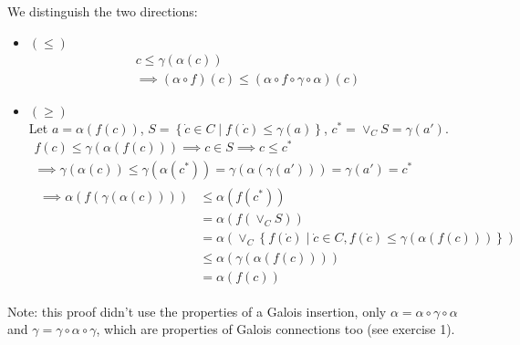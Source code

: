 \begin{exercise}
\begin{itemize}
        We distinguish the two directions:
        \begin{itemize}
            \item $(\leq)$
            \begin{gather*}
                c \leq \gamma(\alpha(c)) \\
                \implies (\alpha \circ f)(c) \leq (\alpha \circ f \circ \gamma \circ \alpha)(c)
            \end{gather*}
            \item $(\geq)$ \\
            Let $a = \alpha(f(c))$, $S = \left\{\dot{c} \in C \mid f(\dot{c}) \leq \gamma(a)\right\}$, $c^* = \vee_C S = \gamma(a')$.
            \begin{gather*}
                f(c) \leq \gamma(\alpha(f(c))) \implies c \in S \implies c \leq c^* \\
                \implies \gamma(\alpha(c)) \leq \gamma(\alpha(c^*)) = \gamma(\alpha(\gamma(a'))) = \gamma(a') = c^* \\
                \begin{aligned}
                    \implies \alpha(f(\gamma(\alpha(c))))
                    &\leq \alpha(f(c^*)) \\
                    &= \alpha(f(\vee_C S)) \\
                    &= \alpha(\vee_C \left\{f(\dot{c}) \mid \dot{c} \in C, f(\dot{c}) \leq \gamma(\alpha(f(c)))\right\}) \\
                    &\leq \alpha(\gamma(\alpha(f(c)))) \\
                    &= \alpha(f(c))
                \end{aligned}
            \end{gather*}
        \end{itemize}
    \end{itemize}
    Note: this proof didn't use the properties of a Galois insertion, only $\alpha = \alpha \circ \gamma \circ \alpha$ and $\gamma = \gamma \circ \alpha \circ \gamma$, which are properties of Galois connections too (see exercise 1).
\end{exercise}
